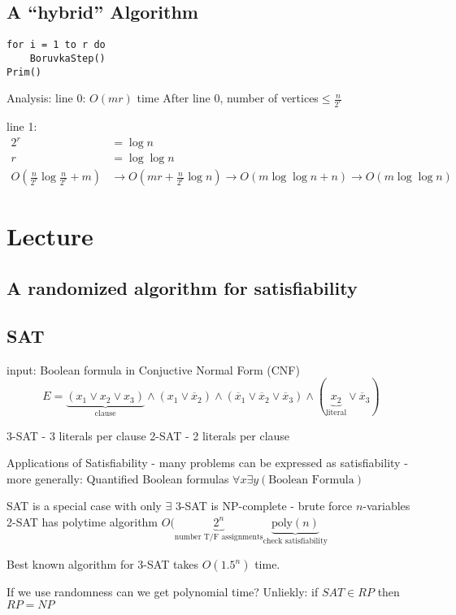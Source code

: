 \documentclass[english,12pt]{article}
\theoremstyle{plain}
\theoremstyle{definition}
\theoremstyle{definition} %
\begin{document}
\subsection{A ``hybrid'' Algorithm}
\begin{verbatim}
for i = 1 to r do
    BoruvkaStep()
Prim()
\end{verbatim}

Analysis:
line 0: $O(mr)$ time
After line 0, number of vertices$\le \frac{n}{2^r}$

line 1:
\begin{align*}
2^r &= \log n\\
r &= \log\log n\\
O\left(\frac{n}{2^r}\log\frac{n}{2^r}+m\right)
&\rightarrow O(mr + \frac{n}{2^r}\log n)
\rightarrow O(m\log\log n + n)
\rightarrow O(m\log\log n)
\end{align*}



\section{Lecture}
\subsection{A randomized algorithm for satisfiability}

\subsection{SAT}
input: Boolean formula in Conjuctive Normal Form (CNF)
\[E=\underbrace{(x_1\vee x_2\vee x_3)}_{\text{clause}}\wedge(x_1\vee\overline{x}_2)\wedge (\overline{x}_1\vee \overline{x}_2\vee \overline{x}_3)\wedge(\underbrace{x_2}_{\text{literal}}\vee \overline{x}_3)\]

3-SAT - 3 literals per clause
2-SAT - 2 literals per clause

Applications of Satisfiability
- many problems can be expressed as satisfiability - more generally: Quantified Boolean formulas $\forall x\exists y (\text{Boolean Formula})$

SAT is a special case with only $\exists$
3-SAT is NP-complete - brute force $n$-variables
2-SAT has polytime algorithm $O(\underbrace{2^n}_{\text{number T/F assignments}}\underbrace{\text{poly}(n)}_{\text{check satisfiability}}$

Best known algorithm for 3-SAT takes $O(1.5^n)$ time.

If we use randomness can we get polynomial time?
Unliekly: if $SAT\in RP$ then $RP=NP$
\end{document}
